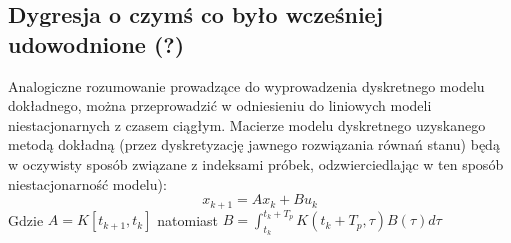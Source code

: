\documentclass{article}
\begin{document}
		\subsection{Dygresja o czymś co było wcześniej udowodnione (?)}
			Analogiczne rozumowanie prowadzące do wyprowadzenia dyskretnego modelu
			dokładnego, można przeprowadzić w odniesieniu do liniowych modeli niestacjonarnych
			z czasem ciągłym. Macierze modelu dyskretnego uzyskanego metodą dokładną (przez
			dyskretyzację jawnego rozwiązania równań stanu) będą w oczywisty sposób związane z
			indeksami próbek, odzwierciedlając w ten sposób niestacjonarność modelu):
			\begin{equation}
				x_{k+1} = Ax_k + Bu_k
			\end{equation}
			Gdzie $A = K[t_{k+1}, t_k]$ natomiast $B = \int_{t_k}^{t_k+T_p}K(t_k+T_p,\tau)B(\tau)d\tau$
\end{document}

